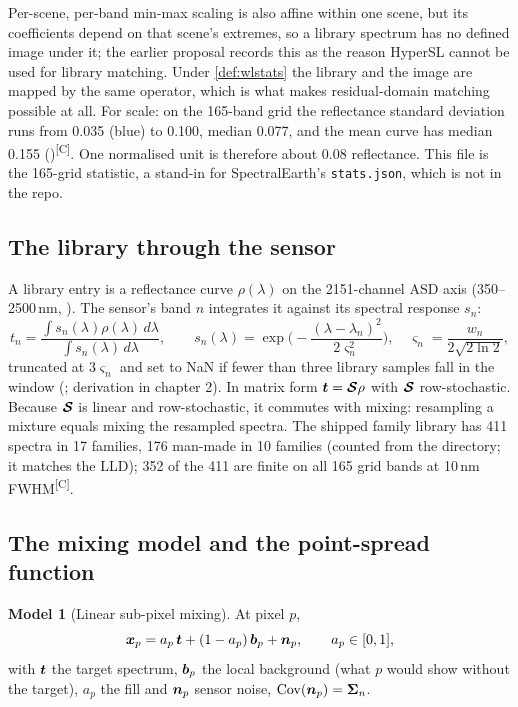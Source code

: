 \documentclass[11pt,a4paper]{article}
\theoremstyle{plain}
\theoremstyle{definition}
\newtheorem{model}[proposition]{Model}
\theoremstyle{remark}
\newcommand{\Cov}{\operatorname{Cov}}
\newcommand{\x}{\B{x}}
\newcommand{\bvec}{\B{b}}
\newcommand{\tv}{\B{t}}
\newcommand{\nv}{\B{n}}
\newcommand{\comp}{\textsuperscript{\textsf{\scriptsize[C]}}}
\begin{document}
Per-scene, per-band min-max scaling is also affine within one scene, but its coefficients depend on that scene's
extremes, so a library spectrum has no defined image under it; the earlier proposal records this as the reason
HyperSL cannot be used for library matching. Under \cref{def:wlstats} the library and the image are mapped by the
same operator, which is what makes residual-domain matching possible at all. For scale: on the 165-band grid the
reflectance standard deviation runs from 0.035 (blue) to 0.100, median 0.077, and the mean curve has median
0.155 ()\comp. One normalised unit is therefore about 0.08 reflectance.
This file is the 165-grid statistic, a stand-in for SpectralEarth's \verb|stats.json|, which is not in the repo.

\subsection{The library through the sensor}

A library entry is a reflectance curve $\rho(\lambda)$ on the 2151-channel ASD axis (350--2500\,nm,
). The sensor's band $n$ integrates it against its spectral response $s_n$:
\[
  t_n=\frac{\int s_n(\lambda)\rho(\lambda)\,d\lambda}{\int s_n(\lambda)\,d\lambda},\qquad
  s_n(\lambda)=\exp\!\Big(-\frac{(\lambda-\lambda_n)^2}{2\varsigma_n^2}\Big),\quad
  \varsigma_n=\frac{w_n}{2\sqrt{2\ln 2}},
\]
truncated at $3\varsigma_n$ and set to NaN if fewer than three library samples fall in the window
(; derivation in  chapter 2). In matrix form
$\tv=\B{\mathcal S}\rho$ with $\bm{\mathcal S}$ row-stochastic. Because $\bm{\mathcal S}$ is linear and
row-stochastic, it commutes with mixing: resampling a mixture equals mixing the resampled spectra. The shipped
family library has 411 spectra in 17 families, 176 man-made in 10 families (counted from the directory;
it matches the LLD); 352 of the 411 are finite on all 165 grid bands at 10\,nm FWHM\comp.

\subsection{The mixing model and the point-spread function}

\begin{model}[Linear sub-pixel mixing]
\label{mod:mix}
At pixel $p$,
\[
  \x_p = a_p\,\tv + (1-a_p)\,\bvec_p + \nv_p,\qquad a_p\in[0,1],
\]
with $\tv$ the target spectrum, $\bvec_p$ the local background (what $p$ would show without the target), $a_p$
the fill and $\nv_p$ sensor noise, $\Cov(\nv_p)=\B\Sigma_n$.
\end{model}
\end{document}
